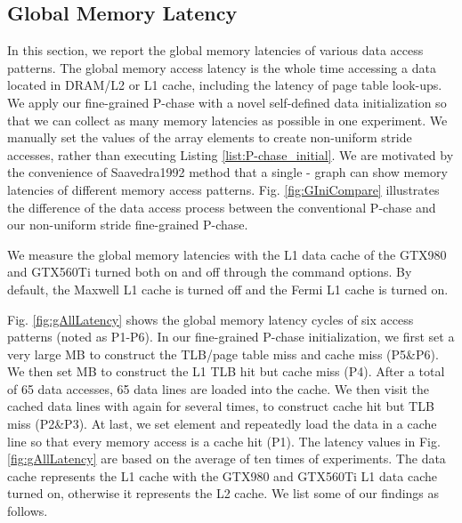\documentclass[10pt,journal,compsoc]{IEEEtran}
\theoremstyle{definition}
\begin{document}
\subsection{Global Memory Latency}

In this section, we report the global memory latencies of various data access patterns. The global memory access latency is the whole time accessing a data located in DRAM/L2 or L1 cache, including the latency of page table look-ups. We apply our fine-grained P-chase with a novel self-defined data initialization so that we can collect as many memory latencies as possible in one experiment. We manually set the values of the array elements to create non-uniform stride accesses, rather than executing Listing \ref{list:P-chase_initial}. We are motivated by the convenience of Saavedra1992 method that a single - graph can show memory latencies of different memory access patterns. Fig. \ref{fig:GIniCompare} illustrates the difference of the data access process between the conventional P-chase and our non-uniform stride fine-grained P-chase.

We measure the global memory latencies with the L1 data cache of the GTX980 and GTX560Ti turned both on and off through the command options. By default, the Maxwell L1 cache is turned off and the Fermi L1 cache is turned on.

Fig. \ref{fig:gAllLatency} shows the global memory latency cycles of six access patterns (noted as P1-P6). In our fine-grained P-chase initialization, we first set a very large  MB to construct the TLB/page table miss and cache miss (P5\&P6). We then set  MB to construct the L1 TLB hit but cache miss (P4). After a total of 65 data accesses, 65 data lines are loaded into the cache. We then visit the cached data lines with  again for several times, to construct cache hit but TLB miss (P2\&P3). At last, we set  element and repeatedly load the data in a cache line so that every memory access is a cache hit (P1). The latency values in Fig. \ref{fig:gAllLatency} are based on the average of ten times of experiments. The data cache represents the L1 cache with the GTX980 and GTX560Ti L1 data cache turned on, otherwise it represents the L2 cache. We list some of our findings as follows.
\end{document}
